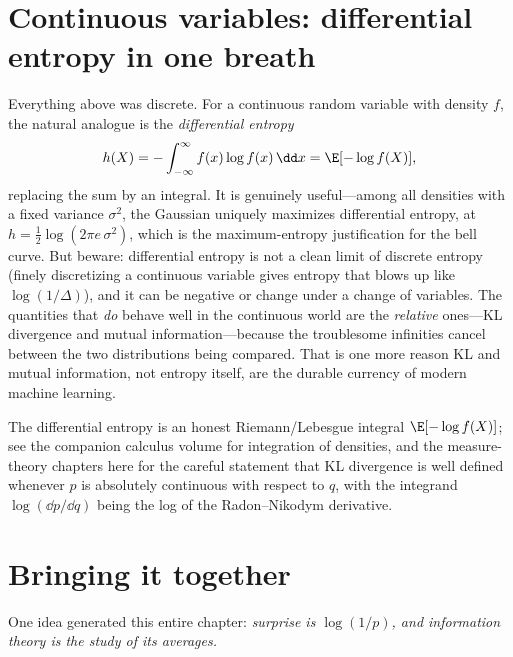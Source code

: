 \section{Continuous variables: differential entropy in one breath}
\label{ch33:differential}

Everything above was discrete. For a continuous random variable with density $f$, the natural analogue is
the \emph{differential entropy}
\[
  h(X) = -\int_{-\infty}^{\infty} f(x)\log f(x)\,\dd x = \E[-\log f(X)],
\]
replacing the sum by an integral. It is genuinely useful---among all densities with a fixed variance
$\sigma^2$, the Gaussian uniquely maximizes differential entropy, at $h = \tfrac12\log(2\pi e\,\sigma^2)$,
which is the maximum-entropy justification for the bell curve. But beware: differential entropy is not a
clean limit of discrete entropy (finely discretizing a continuous variable gives entropy that blows up
like $\log(1/\Delta)$), and it can be negative or change under a change of variables. The quantities that
\emph{do} behave well in the continuous world are the \emph{relative} ones---KL divergence and mutual
information---because the troublesome infinities cancel between the two distributions being compared. That
is one more reason KL and mutual information, not entropy itself, are the durable currency of modern
machine learning.

\begin{connectionbox}
The differential entropy is an honest Riemann/Lebesgue integral $\E[-\log f(X)]$; see the companion
calculus volume for integration of densities, and the measure-theory chapters here for the careful
statement that KL divergence is well defined whenever $p$ is absolutely continuous with respect to $q$,
with the integrand $\log(\dd p/\dd q)$ being the log of the Radon--Nikodym derivative.
\end{connectionbox}

\section{Bringing it together}
\label{ch33:summary}

One idea generated this entire chapter: \emph{surprise is $\log(1/p)$, and information theory is the study
of its averages.}

